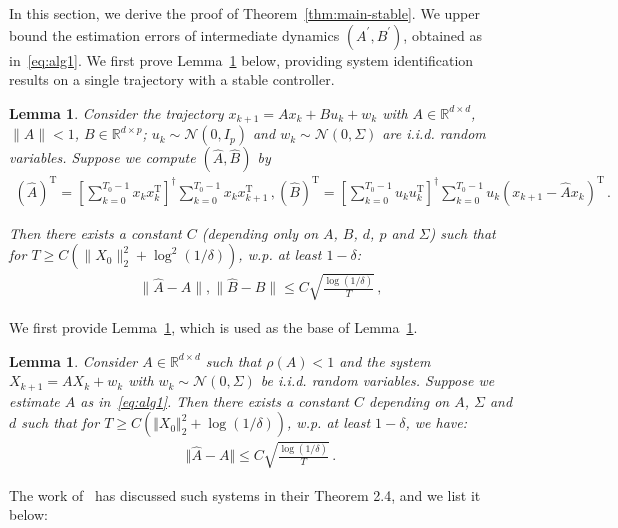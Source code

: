 \documentclass{article}
\newtheorem{lemma}[theorem]{Lemma}
\theoremstyle{definition}
\begin{document}
In this section, we derive the proof of Theorem~\ref{thm:main-stable}. We upper bound the estimation errors of intermediate dynamics $(A^{'},B^{'})$, obtained as in~\eqref{eq:alg1}.
We first prove Lemma~\ref{lem:A,B} below, providing system identification results on a single trajectory with a stable controller.

\begin{lemma}\label{lem:A,B}
Consider the trajectory $x_{k+1}=Ax_{k}+Bu_{k}+w_{k}$ with $A\in \mathbb{R}^{d\times d}$, $\|A\|<1$, $B\in \mathbb{R}^{d\times p}$; $u_{k}\sim\mathcal{N}(0,I_{p})$ and $w_{k}\sim\mathcal{N}(0,\Sigma)$ are i.i.d. random variables. Suppose we compute $(\hat{A},\hat{B})$ by	
\begin{align}\label{eq:lem:A,B}
(\hat{A})^{\mathrm{T}}=\left[\sum_{k=0}^{T_{0}-1}x_{k}x^{\mathrm{T}}_{k}\right]^{\dagger}\sum_{k=0}^{T_{0}-1}x_{k}x^{\mathrm{T}}_{k+1}\,,(\hat{B})^{\mathrm{T}}=\left[\sum_{k=0}^{T_{0}-1}u_{k}u^{\mathrm{T}}_{k}\right]^{\dagger}\sum_{k=0}^{T_{0}-1}u_{k}\left(x_{k+1}-\hat{A}x_{k}\right)^{\mathrm{T}}\,.
\end{align}	

Then there exists a constant $C$ (depending only on $A$, $B$, $d$, $p$ and $\Sigma$) such that for $T\geq C\left(\|X_{0}\|^{2}_{2}+\log^{2}(1/\delta)\right)$, w.p. at least $1-\delta$:
\begin{align}
\|\hat{A}-A\|,\|\hat{B}-B\|\leq C\sqrt{\frac{\log(1/\delta)}{T}}\,,
\end{align}
\end{lemma}


We first provide Lemma~\ref{lem:A}, which is used as the base of Lemma~\ref{lem:A,B}.
\begin{lemma}\label{lem:A}
Consider $A\in \mathbb{R}^{d\times d}$ such that $\rho(A)<1$ and the system $X_{k+1}=AX_{k}+w_{k}$ with $w_{k}\sim\mathcal{N}(0,\Sigma)$ be i.i.d. random variables. Suppose we estimate $A$ as in~\eqref{eq:alg1}. 
Then there exists a constant $C$ depending on $A$, $\Sigma$ and $d$ such that for $T\geq C(\Vert X_{0}\Vert ^{2}_{2}+\log(1/\delta))$, w.p. at least $1-\delta$, we have:
\begin{align*}
\Vert \hat{A}-A\Vert \leq C\sqrt{\frac{\log(1/\delta)}{T}}\,.
\end{align*}
\end{lemma}


The work of~\citep{ref4} has discussed such systems in their Theorem 2.4, and we list it below:
\end{document}
